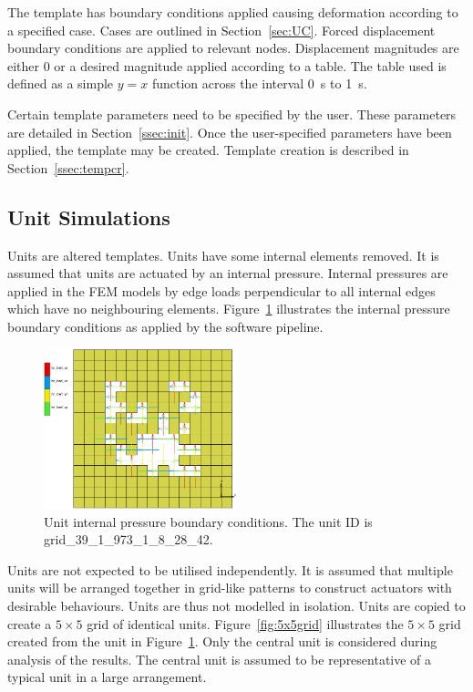 The template has boundary conditions applied causing deformation according to a specified case. Cases are outlined in Section~\ref{sec:UC}. Forced displacement boundary conditions are applied to relevant nodes. Displacement magnitudes are either 0 or a desired magnitude applied according to a table. The table used is defined as a simple $y=x$ function across the interval \SI{0}{\second} to \SI{1}{\second}.

Certain template parameters need to be specified by the user. These parameters are detailed in Section~\ref{ssec:init}. Once the user-specified parameters have been applied, the template may be created. Template creation is described in Section~\ref{ssec:tempcr}.

\subsection{Unit Simulations}
\label{ssec:us}

Units are altered templates. Units have some internal elements removed. It is assumed that units are actuated by an internal pressure. Internal pressures are applied in the FEM models by edge loads perpendicular to all internal edges which have no neighbouring elements. Figure~\ref{fig:uip} illustrates the internal pressure boundary conditions as applied by the software pipeline.

\begin{figure}[H]
	\centering
	\includegraphics[width=0.5\textwidth]{5x5Single.png}
	\caption[Unit internal pressure boundary conditions]{Unit internal pressure boundary conditions. The unit ID is grid\_39\_1\_973\_1\_8\_28\_42.}
	\label{fig:uip}
\end{figure}

Units are not expected to be utilised independently. It is assumed that multiple units will be arranged together in grid-like patterns to construct actuators with desirable behaviours. Units are thus not modelled in isolation. Units are copied to create a $5\times 5$ grid of identical units. Figure~\ref{fig:5x5grid} illustrates the $5\times 5$ grid created from the unit in Figure~\ref{fig:uip}. Only the central unit is considered during analysis of the results. The central unit is assumed to be representative of a typical unit in a large arrangement.

